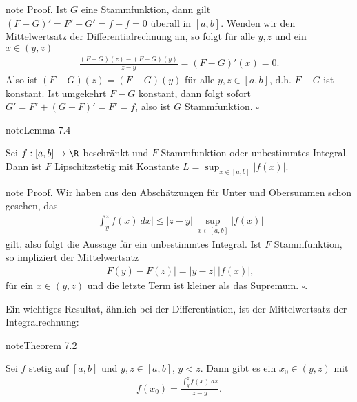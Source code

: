 \documentclass[letterpaper,10pt,english]{jupyterBook}
\begin{document}
\begin{sphinxadmonition}{note}
Proof. Ist \(G\) eine Stammfunktion, dann gilt \((F-G)'=F'-G'= f-f=0\) überall in \([a,b]\). Wenden wir den Mittelwertsatz der Differentialrechnung an, so folgt für alle \(y,z\) und ein \(x \in (y,z)\)
\begin{equation*}
\begin{split} \frac{(F-G)(z) - (F-G)(y)}{z-y} = (F-G)'(x) = 0.\end{split}
\end{equation*}
Also ist \((F-G)(z) = (F-G)(y)\) für alle \(y,z \in  [a,b]\), d.h. \(F-G\) ist konstant.
Ist umgekehrt \(F-G\) konstant, dann folgt sofort \(G' = F' + (G-F)' = F'=f\), also ist \(G\) Stammfunktion. \(\square\)
\end{sphinxadmonition}
\label{integration/hdi:lemma-1}
\begin{sphinxadmonition}{note}{Lemma 7.4}



Sei \(f:[a,b]\rightarrow \R\) beschränkt und \(F\) Stammfunktion oder unbestimmtes Integral. Dann ist \(F\) Lipschitz\sphinxhyphen{}stetig mit Konstante \(L=\sup_{x \in [a,b]} \vert f(x) \vert. \)
\end{sphinxadmonition}

\begin{sphinxadmonition}{note}
Proof. Wir haben aus den Abschätzungen für Unter\sphinxhyphen{} und Obersummen schon gesehen, das
\begin{equation*}
\begin{split} \vert \int_y^z f(x)~dx \vert \leq \vert z -y \vert ~\sup_{x \in [a,b]} \vert f(x) \vert\end{split}
\end{equation*}
gilt, also folgt die Aussage für ein unbestimmtes Integral. Ist \(F\) Stammfunktion, so impliziert der Mittelwertsatz
\begin{equation*}
\begin{split} \vert F(y) - F(z) \vert = \vert y - z \vert ~\vert f(x) \vert,\end{split}
\end{equation*}
für ein \(x \in (y,z)\) und die letzte Term ist kleiner als das Supremum. \(\square\).
\end{sphinxadmonition}

Ein wichtiges Resultat, ähnlich bei der Differentiation, ist der Mittelwertsatz der Integralrechnung:
\label{integration/hdi:theorem-2}
\begin{sphinxadmonition}{note}{Theorem 7.2}



Sei \(f\) stetig auf \([a,b]\) und \(y,z \in [a,b]\), \(y < z\). Dann gibt es ein \(x_0 \in (y,z)\) mit
\begin{equation*}
\begin{split} f(x_0) = \frac{\int_y^z f(x)~dx}{z-y}.\end{split}
\end{equation*}\end{sphinxadmonition}
\end{document}
